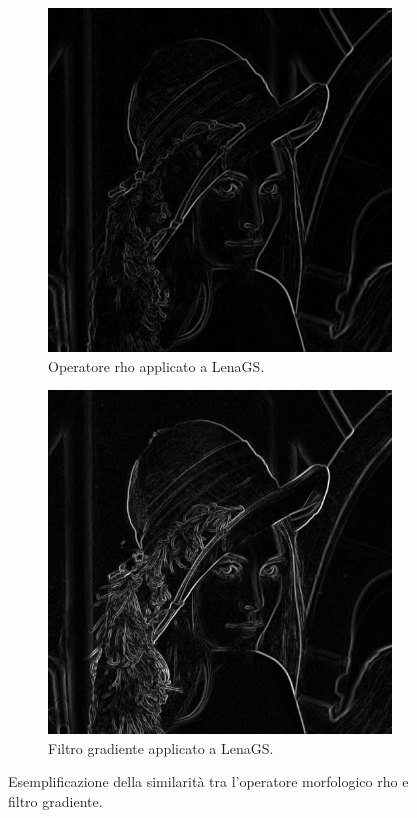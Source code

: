 \documentclass{subfiles}
\begin{document}
\begin{figure}[!h]
    \centering
    \begin{subfigure}[b]{0.4\textwidth}
        \centering
        \includegraphics[scale = 0.3]{../Images/Lena/Lena con operatore rho.png}
        \caption{Operatore rho applicato a LenaGS.}
    \end{subfigure}
    \hspace{10pt}
    \begin{subfigure}[b]{0.4\textwidth}
        \centering
        \includegraphics[scale = 0.3]{../Images/Lena/Gradiente Lena.png}
        \caption{Filtro gradiente applicato a LenaGS.}
    \end{subfigure}
    \caption{Esemplificazione della similarità tra l'operatore morfologico rho e filtro gradiente.}
    \label{fig:7.3}
\end{figure}
\end{document}
